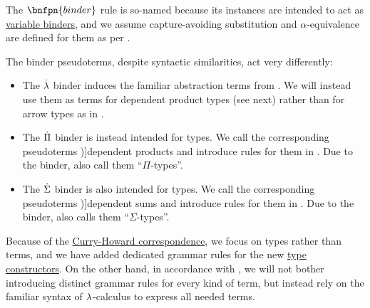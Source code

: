 \begin{definition}
  The \( \bnfpn{binder} \) rule is so-named because its instances are intended to act as \hyperref[con:variable_binding]{variable binders}, and we assume capture-avoiding substitution and \( \alpha \)-equivalence are defined for them as per .

  The binder pseudoterms, despite syntactic similarities, act very differently:
  \begin{itemize}
    \item The \( \dot{{\mathrm \lambda}} \) binder induces the familiar abstraction terms from . We will instead use them as terms for dependent product types (see next) rather than for arrow types as in .

    \item The \( \dot{\Pi} \) binder is instead intended for types. We call the corresponding pseudoterms \term[en=dependent product (\cite[\S 1.4]{UnivalentFoundationsProgram2024OctoberHoTT})]{dependent products} and introduce rules for them in . Due to the binder,  also call them \enquote{\( \Pi \)-types}.

    \item The \( \dot{\Sigma} \) binder is also intended for types. We call the corresponding pseudoterms \term[en=dependent sum (\cite[\S 8.3.4]{Mimram2020ProgramEqualsProof})]{dependent sums} and introduce rules for them in . Due to the binder,  also calls them \enquote{\( \Sigma \)-types}.
  \end{itemize}
\end{definition}
\begin{comments}
  \item Because of the \hyperref[con:curry_howard_correspondence]{Curry-Howard correspondence}, we focus on types rather than terms, and we have added dedicated grammar rules for the new \hyperref[con:type_constructor]{type constructors}. On the other hand, in accordance with , we will not bother introducing distinct grammar rules for every kind of term, but instead rely on the familiar syntax of \( {\mathrm \lambda} \)-calculus to express all needed terms.
\end{comments}

